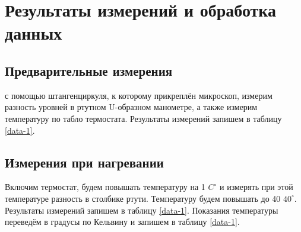 \documentclass[a4paper,12pt]{article}
\begin{document}
\section{Результаты измерений и обработка данных}

\subsection{Предварительные измерения}

с помощью штангенциркуля, к которому прикреплён микроскоп, измерим разность уровней в ртутном U-образном манометре, а также измерим температуру по табло термостата. Результаты измерений запишем в таблицу \ref{data-1}.

\subsection{Измерения при нагревании}

Включим термостат, будем повышать температуру на 1 $C^\circ$ и измерять при этой температуре разность в столбике ртути. Температуру будем повышать до 40 $40^\circ$. Результаты измерений запишем в таблицу \ref{data-1}. Показания температуры переведём в градусы по Кельвину и запишем в таблицу \ref{data-1}.
\end{document}

